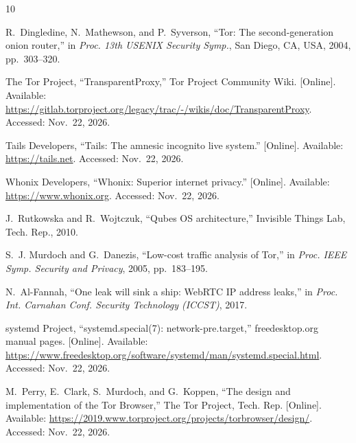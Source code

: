 \documentclass[10pt,twocolumn,a4paper]{article}
\DeclareRobustCommand{\texttt}[1]{\mbox{\ttfamily #1}}
\begin{document}
{\footnotesize
\begin{thebibliography}{10}
\raggedright
\setlength{\itemsep}{1pt}

R.~Dingledine, N.~Mathewson, and P.~Syverson, ``Tor: The
second-generation onion router,'' in \emph{Proc. 13th USENIX Security
Symp.}, San Diego, CA, USA, 2004, pp.~303--320.

The Tor Project, ``TransparentProxy,'' Tor Project Community Wiki.
[Online]. Available:
\url{https://gitlab.torproject.org/legacy/trac/-/wikis/doc/TransparentProxy}.
Accessed: Nov.~22, 2026.

Tails Developers, ``Tails: The amnesic incognito live system.''
[Online]. Available: \url{https://tails.net}. Accessed: Nov.~22, 2026.

Whonix Developers, ``Whonix: Superior internet privacy.''
[Online]. Available: \url{https://www.whonix.org}. Accessed: Nov.~22, 2026.

J.~Rutkowska and R.~Wojtczuk, ``Qubes OS architecture,'' Invisible
Things Lab, Tech. Rep., 2010.

S.~J. Murdoch and G.~Danezis, ``Low-cost traffic analysis of Tor,'' in
\emph{Proc. IEEE Symp. Security and Privacy}, 2005, pp.~183--195.

N.~Al-Fannah, ``One leak will sink a ship: WebRTC IP address leaks,''
in \emph{Proc. Int. Carnahan Conf. Security Technology (ICCST)}, 2017.

systemd Project, ``systemd.special(7): \texttt{network-pre.target},''
freedesktop.org manual pages. [Online]. Available:
\url{https://www.freedesktop.org/software/systemd/man/systemd.special.html}.
Accessed: Nov.~22, 2026.

M.~Perry, E.~Clark, S.~Murdoch, and G.~Koppen, ``The design and
implementation of the Tor Browser,'' The Tor Project, Tech. Rep.
[Online]. Available:
\url{https://2019.www.torproject.org/projects/torbrowser/design/}.
Accessed: Nov.~22, 2026.

\end{thebibliography}
}
\end{document}
